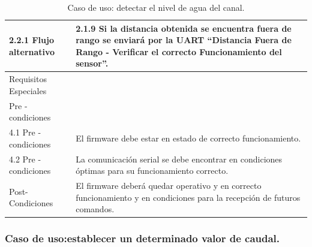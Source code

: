 \begin{table}[t]
\begin{center}
\begin{tabular}{ | m{4cm} | m{9.5cm} | }
2.2.1 Flujo alternativo  & 
2.1.9 Si la distancia obtenida se encuentra fuera de rango se enviará por la UART “Distancia Fuera de Rango - Verificar el correcto Funcionamiento del  sensor”. \\ \hline

Requisitos Especiales & \\ \hline


Pre - condiciones & \\ \hline
 
4.1 Pre - condiciones & 
El firmware debe estar en estado de correcto funcionamiento. \\ \hline

4.2 Pre - condiciones &
La comunicación serial se debe encontrar en condiciones óptimas para su funcionamiento correcto. \\ \hline

Post- Condiciones &
El firmware deberá quedar operativo y en correcto 
funcionamiento y en condiciones para la recepción de futuros comandos. \\ \hline

\end{tabular}
\caption{ Caso de uso: detectar el nivel de agua del canal.}
\label{tab:coches}
\end{center}
\end{table}

\subsubsection{Caso de uso:establecer un determinado valor de caudal.}

